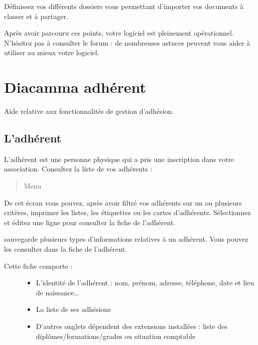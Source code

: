 \documentclass[a4paper,10pt,oneside,french]{sphinxmanual}
\begin{document}
\sphinxAtStartPar
Définissez vos différents dossiers vous permettant d’importer vos documents à classer et à partager.

\sphinxAtStartPar
Après avoir parcouru ces points, votre logiciel  est pleinement opérationnel.
N’hésitez pas à consulter le forum : de nombreuses astuces peuvent vous aider à utiliser au mieux votre logiciel.


\chapter{Diacamma adhérent}
\label{\detokenize{member/index:diacamma-adherent}}\label{\detokenize{member/index::doc}}
\sphinxAtStartPar
Aide relative aux fonctionnalités de gestion d’adhésion.


\section{L’adhérent}
\label{\detokenize{member/member:ladherent}}\label{\detokenize{member/member::doc}}
\sphinxAtStartPar
L’adhérent est une personne physique qui a pris une inscription dans votre association.
Consultez la liste de vos adhérents :
\begin{quote}

\sphinxAtStartPar
Menu 
\end{quote}

\noindent{}

\sphinxAtStartPar
De cet écran vous pouvez, après avoir filtré vos adhérents sur un ou plusieurs critères, imprimer les listes, les étiquettes ou les cartes d’adhérents.
Sélectionnez et éditez une ligne pour consulter la fiche de l’adhérent.

\sphinxAtStartPar
{} sauvegarde plusieurs types d’informations relatives à un adhérent. Vous pouvez les consulter dans la fiche de l’adhérent.

\noindent{}
\begin{description}
\item[{Cette fiche comporte :}] \leavevmode\begin{itemize}
\item {} 
\sphinxAtStartPar
L’identité de l’adhérent : nom, prénom, adresse, téléphone, date et lieu de naissance…

\item {} 
\sphinxAtStartPar
La liste de ses adhésions

\item {} 
\sphinxAtStartPar
D’autres onglets dépendent des extensions installées : liste des diplômes/formations/grades ou situation comptable

\end{itemize}

\end{description}
\end{document}
